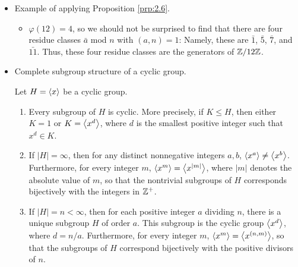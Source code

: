 \documentclass[../notes.tex]{subfiles}
\begin{document}
\begin{itemize}
\begin{proposition}
\begin{enumerate}
            \begin{proof}
                Given.
            \end{proof}
        \end{enumerate}
    \end{proposition}
    \begin{proposition}\label{prp:2.6}
        Let $H=\gen{x}$.
        \begin{enumerate}
            \item Assume $|x|=\infty$. Then $H=\gen{x^a}$ iff $a=\pm 1$.
            \item Assume $|x|=n<\infty$. Then $H=\gen{x^a}$ iff $(a,n)=1$. In particular, the number of generators of $H$ is $\varphi(n)$ (where $\varphi$ is Euler's $\varphi$-function).
        \end{enumerate}
        \begin{proof}
            Given.
        \end{proof}
    \end{proposition}
    \item Example of applying Proposition \ref{prp:2.6}.
    \begin{itemize}
        \item $\varphi(12)=4$, so we should not be surprised to find that there are four residue classes $\bar{a}$ mod $n$ with $(a,n)=1$: Namely, these are $\bar{1}$, $\bar{5}$, $\bar{7}$, and $\bar{11}$. Thus, these four residue classes are the generators of $\mathbb{Z}/12\mathbb{Z}$.
    \end{itemize}
    \item Complete subgroup structure of a cyclic group.
    \begin{theorem}\label{trm:2.7}
        Let $H=\gen{x}$ be a cyclic group.
        \begin{enumerate}
            \item Every subgroup of $H$ is cyclic. More precisely, if $K\leq H$, then either $K=1$ or $K=\left\langle{x^d}\right\rangle$, where $d$ is the smallest positive integer such that $x^d\in K$.
            \item If $|H|=\infty$, then for any distinct nonnegative integers $a,b$, $\left\langle{x^a}\right\rangle\neq\left\langle{x^b}\right\rangle$. Furthermore, for every integer $m$, $\left\langle{x^m}\right\rangle=\left\langle{x^{|m|}}\right\rangle$, where $|m|$ denotes the absolute value of $m$, so that the nontrivial subgroups of $H$ corresponds bijectively with the integers in $\mathbb{Z}^+$.
            \item If $|H|=n<\infty$, then for each positive integer $a$ dividing $n$, there is a unique subgroup $H$ of order $a$. This subgroup is the cyclic group $\left\langle{x^d}\right\rangle$, where $d=n/a$. Furthermore, for every integer $m$, $\left\langle{x^m}\right\rangle=\left\langle{x^{(n,m)}}\right\rangle$, so that the subgroups of $H$ correspond bijectively with the positive divisors of $n$.

\end{enumerate}
\end{theorem}
\end{itemize}
\end{document}
